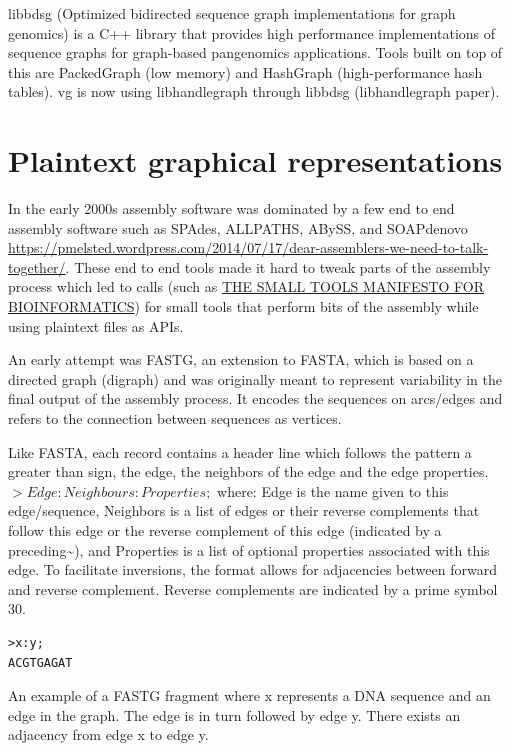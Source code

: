 \documentclass[11pt]{article}
\begin{document}
libbdsg (Optimized bidirected sequence graph implementations for graph genomics)
is a C++ library that provides high performance implementations of sequence 
graphs for graph-based pangenomics applications. Tools built on top of this are
PackedGraph (low memory) and HashGraph (high-performance hash tables).
vg is now using libhandlegraph through libbdsg (libhandlegraph paper).

\section{Plaintext graphical representations}
\label{sec:org41b6456}
In the early 2000s assembly software was dominated by a few end to end assembly
software such as SPAdes, ALLPATHS, ABySS, and SOAPdenovo
\url{https://pmelsted.wordpress.com/2014/07/17/dear-assemblers-we-need-to-talk-together/}.
These end to end tools made it hard to tweak parts of the assembly process which
led to calls (such as \href{https://github.com/pjotrp/bioinformatics\#the-small-tools-manifesto-for-bioinformatics}{THE SMALL TOOLS MANIFESTO FOR BIOINFORMATICS}) for small
tools that perform bits of the assembly while using plaintext files as APIs.

An early attempt was FASTG,  an extension to FASTA, which is based on a directed
graph (digraph) and was originally meant to represent variability in the final
output of the assembly process.
It encodes the sequences on arcs/edges and refers to the connection
between sequences as vertices.

Like FASTA, each record contains a header line which follows the pattern
a greater than sign, the edge, the neighbors of the edge and the edge properties.
\(>Edge:Neighbours:Properties;\) where: Edge is the name given to this 
edge/sequence, Neighbors is a list of edges or their reverse complements that
follow this edge or the reverse complement of this edge
(indicated by a preceding\textasciitilde{}), and Properties is a list of optional properties 
associated with this edge. To facilitate
inversions, the format allows for adjacencies between forward and reverse
complement. Reverse complements are indicated by a prime symbol 30\textprime.


\begin{verbatim}
>x:y;
ACGTGAGAT
\end{verbatim}
An example of a FASTG fragment where x represents
a DNA sequence and an edge in the graph. The edge is in turn followed by edge y. 
There exists an adjacency from edge x to edge y.
\end{document}
